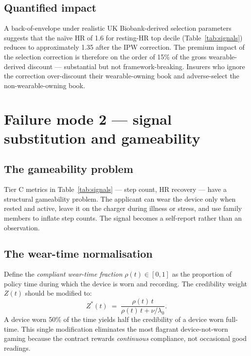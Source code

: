 \subsection{Quantified impact}\label{ss:sel-impact}

A back-of-envelope under realistic UK Biobank-derived selection
parameters suggests that the na\"ive HR of 1.6 for resting-HR top
decile (Table~\ref{tab:signals}) reduces to approximately 1.35 after
the IPW correction. The premium impact of the selection correction
is therefore on the order of 15\% of the gross wearable-derived
discount --- substantial but not framework-breaking. Insurers who
ignore the correction over-discount their wearable-owning book and
adverse-select the non-wearable-owning book.

\section{Failure mode 2 --- signal substitution and gameability}\label{sec:gameability}

\subsection{The gameability problem}\label{ss:game}

Tier C metrics in Table~\ref{tab:signals} --- step count, HR
recovery --- have a structural gameability problem. The applicant
can wear the device only when rested and active, leave it on the
charger during illness or stress, and use family members to inflate
step counts. The signal becomes a self-report rather than an
observation.

\subsection{The wear-time normalisation}\label{ss:weartime}

Define the \emph{compliant wear-time fraction}
$\rho(t) \in [0,1]$ as the proportion of policy time during which
the device is worn and recording. The credibility weight $Z(t)$
should be modified to:
\begin{equation}\label{eq:Z-rho}
   Z^*(t) \;=\; \frac{\rho(t)\,t}{\rho(t)\,t + \nu/\lambda_0}.
\end{equation}
A device worn 50\% of the time yields half the credibility of a
device worn full-time. This single modification eliminates the
most flagrant device-not-worn gaming because the contract rewards
\emph{continuous} compliance, not occasional good readings.


